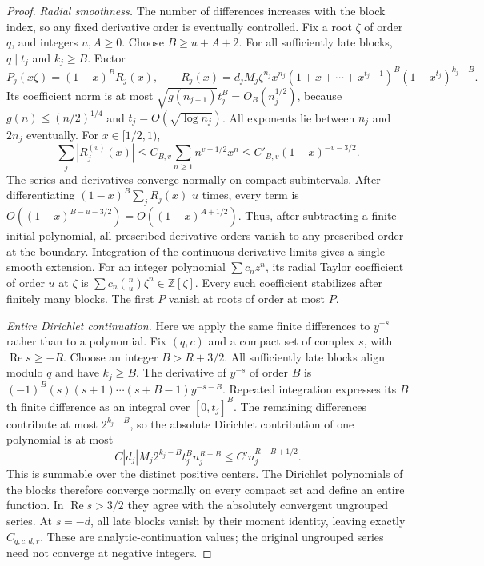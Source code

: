 \documentclass[11pt]{article}
\theoremstyle{plain}
\theoremstyle{definition}
\theoremstyle{remark}
\newcommand{\Z}{\mathbb{Z}}
\begin{document}
\begin{proof}
\emph{Radial smoothness.} The number of differences increases with the
block index, so any fixed derivative order is eventually controlled.
Fix a root $\zeta$ of order $q$, and integers $u,A\ge0$. Choose
$B\ge u+A+2$. For all sufficiently late blocks,
$q\mid t_j$ and $k_j\ge B$. Factor
\[
 P_j(x\zeta)=(1-x)^B R_j(x),\qquad
 R_j(x)=d_jM_j\zeta^{n_j}x^{n_j}
 (1+x+\cdots+x^{t_j-1})^B(1-x^{t_j})^{k_j-B}.
\]
Its coefficient norm is at most
$\sqrt{g(n_{j-1})}t_j^B=O_B(n_j^{1/2})$, because
$g(n)\le(n/2)^{1/4}$ and $t_j=O(\sqrt{\log n_j})$.
All exponents lie between $n_j$ and $2n_j$ eventually. For $x\in[1/2,1)$,
\[
 \sum_j|R_j^{(v)}(x)|
 \le C_{B,v}\sum_{n\ge1}n^{v+1/2}x^n
 \le C'_{B,v}(1-x)^{-v-3/2}.
\]
The series and derivatives converge normally on compact subintervals.
After differentiating $(1-x)^B\sum_jR_j(x)$ $u$ times, every term is
$O((1-x)^{B-u-3/2})=O((1-x)^{A+1/2})$. Thus, after subtracting a
finite initial polynomial, all prescribed derivative orders vanish to
any prescribed order at the boundary. Integration of the continuous
derivative limits gives a single smooth extension. For an integer
polynomial $\sum c_nz^n$, its radial Taylor coefficient of order $u$
at $\zeta$ is $\sum c_n\binom nu\zeta^n\in\Z[\zeta]$.
Every such coefficient stabilizes after finitely many blocks. The
first $P$ vanish at roots of order at most $P$.

\emph{Entire Dirichlet continuation.} Here we apply the same finite
differences to $y^{-s}$ rather than to a polynomial. Fix $(q,c)$ and a
compact set of complex $s$, with $\operatorname{Re}s\ge-R$. Choose an
integer $B>R+3/2$. All sufficiently late blocks align modulo $q$ and
have $k_j\ge B$. The derivative of $y^{-s}$ of order $B$ is
$(-1)^B(s)(s+1)\cdots(s+B-1)y^{-s-B}$. Repeated integration expresses
its $B$th finite difference as an integral over $[0,t_j]^B$.
The remaining differences contribute at most $2^{k_j-B}$, so the
absolute Dirichlet contribution of one polynomial is at most
\[
 C|d_j|M_j2^{k_j-B}t_j^B n_j^{R-B}
 \le C' n_j^{R-B+1/2}.
\]
This is summable over the distinct positive centers. The Dirichlet polynomials of the blocks therefore converge normally on every compact
set and define an entire function. In $\operatorname{Re}s>3/2$ they
agree with the absolutely convergent ungrouped series. At $s=-d$,
all late blocks vanish by their moment identity, leaving exactly
$C_{q,c,d,r}$. These are analytic-continuation values; the original
ungrouped series need not converge at negative integers.
\end{proof}
\end{document}
